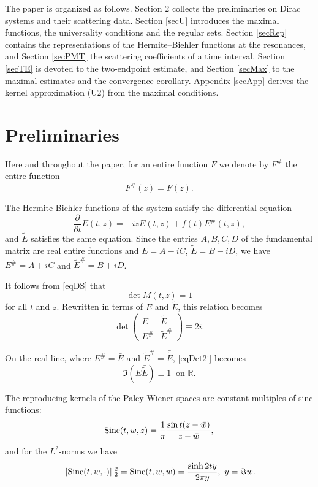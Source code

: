 \documentclass[11pt,twoside,reqno]{amsart}
\def\ti{\tilde}
\def\pa{\partial}
\def\R{{\mathbb R}}
\def\S{\text{\rm Sinc}}
\theoremstyle{plain}
\numberwithin{equation}{section}
\begin{document}
The paper is organized as follows. Section 2 collects the preliminaries on Dirac systems and their scattering data. Section \ref{secU} introduces the maximal functions, the universality conditions and the regular sets. Section \ref{secRep} contains the representations of the Hermite--Biehler functions at the resonances, and Section \ref{secPMT} the scattering coefficients of a time interval. Section \ref{secTE} is devoted to the two-endpoint estimate, and Section \ref{secMax} to the maximal estimates and the convergence corollary. Appendix \ref{secApp} derives the kernel approximation (U2) from the maximal conditions.



\section{Preliminaries}

Here and throughout the paper, for an entire function $F$ we denote by $F^\#$ the entire function
$$F^\#(z)=\overline{F(\bar z)}.$$

The Hermite-Biehler functions of the system satisfy the differential equation
\begin{equation} \frac \pa {\pa  t} E(t,z)=-izE(t,z) + f (t)E^\# (t,z),\label{eqME}\end{equation}
and $\ti E$ satisfies the same equation. Since the entries $A,B,C,D$ of the fundamental matrix are real entire functions and $E=A-iC$, $\ti E=B-iD$, we have $E^\#=A+iC$ and $\ti E^\#=B+iD$.

It follows from \eqref{eqDS} that
\begin{equation}\det M(t,z)= 1\label{det=1}\end{equation}
for all $t$ and $z$.
Rewritten in terms of $E$ and $\ti E$, this relation becomes
\begin{equation}\det\begin{pmatrix} E &  \ti E \\ E^\# & \ti E^\#
	\end{pmatrix}\equiv 2i.\label{eqDet2i}\end{equation}

On the real line, where $E^\#=\bar E$ and $\ti E^\#=\bar{\ti E}$, \eqref{eqDet2i} becomes
\begin{equation}\Im \left(E\bar{\ti E}\right)\equiv 1\ \text{ on }\R.\label{eqImE}\end{equation}

The reproducing kernels of the Paley-Wiener spaces are constant multiples of sinc functions:
$$ \S(t,w,z)=\frac1\pi\frac{\sin t(z-\bar w)}{z-\bar w},$$
and for the $L^2$-norms we have
$$ ||\S(t,w,\cdot)||_2^2= \S(t,w,w)=\frac {\sinh 2ty}{2\pi y},\ y=\Im w.$$
\end{document}
